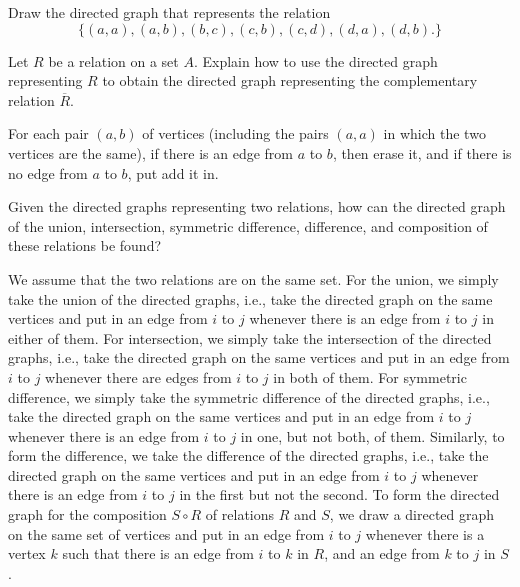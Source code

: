 \begin{exercise}
	Draw the directed graph that represents the relation
	$$\{(a, a), (a, b), (b, c), (c, b), (c, d), (d, a), (d, b).\}$$
\end{exercise}
	\begin{figure}[H]
		\centering
	\end{figure}

\begin{exercise}
	Let \( R \) be a relation on a set \( A \). Explain how to use the directed graph representing \( R \) to obtain the directed graph representing the complementary relation \( \overline{R} \).
\end{exercise}
\begin{solution}
	For each pair \( (a, b) \) of vertices (including the pairs \( (a, a) \) in which the two vertices are the same), if there is an edge from \( a \) to \( b \), then erase it, and if there is no edge from \( a \) to \( b \), put add it in.
\end{solution}

\begin{exercise}
	Given the directed graphs representing two relations, how can the directed graph of the union, intersection, symmetric difference, difference, and composition of these relations be found?
\end{exercise}
\begin{solution}
	We assume that the two relations are on the same set. For the union, we simply take the union of the directed graphs, i.e., take the directed graph on the same vertices and put in an edge from \( i \) to \( j \) whenever there is an edge from \( i \) to \( j \) in either of them. For intersection, we simply take the intersection of the directed graphs, i.e., take the directed graph on the same vertices and put in an edge from \( i \) to \( j \) whenever there are edges from \( i \) to \( j \) in both of them. For symmetric difference, we simply take the symmetric difference of the directed graphs, i.e., take the directed graph on the same vertices and put in an edge from \( i \) to \( j \) whenever there is an edge from \( i \) to \( j \) in one, but not both, of them. Similarly, to form the difference, we take the difference of the directed graphs, i.e., take the directed graph on the same vertices and put in an edge from \( i \) to \( j \) whenever there is an edge from \( i \) to \( j \) in the first but not the second. To form the directed graph for the composition \( S \circ R \) of relations \( R \) and \( S \), we draw a directed graph on the same set of vertices and put in an edge from \( i \) to \( j \) whenever there is a vertex \( k \) such that there is an edge from \( i \) to \( k \) in \( R \), and an edge from \( k \) to \( j \) in \( S \).
\end{solution}


